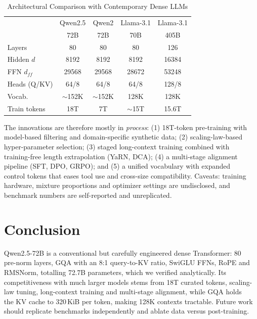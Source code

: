\documentclass[conference]{IEEEtran}
\begin{document}
\begin{table}[!tb]
\caption{Architectural Comparison with Contemporary Dense LLMs}
\label{tab:arch}
\centering\footnotesize
\setlength{\tabcolsep}{2.5pt}
\begin{tabular}{@{}lcccc@{}}
\toprule
 & Qwen2.5 & Qwen2 & Llama-3.1 & Llama-3.1 \\
 & 72B & 72B & 70B & 405B \\
\midrule
Layers & 80 & 80 & 80 & 126 \\
Hidden $d$ & 8192 & 8192 & 8192 & 16384 \\
FFN $d_{ff}$ & 29568 & 29568 & 28672 & 53248 \\
Heads (Q/KV) & 64/8 & 64/8 & 64/8 & 128/8 \\
Vocab. & $\sim$152K & $\sim$152K & 128K & 128K \\
Train tokens & 18T & 7T & $\sim$15T & 15.6T \\
\bottomrule
\end{tabular}
\end{table}

The innovations are therefore mostly in \textit{process}: (1) 18T-token pre-training with model-based filtering and domain-specific synthetic data; (2) scaling-law-based hyper-parameter selection; (3) staged long-context training combined with training-free length extrapolation (YaRN, DCA); (4) a multi-stage alignment pipeline (SFT, DPO, GRPO); and (5) a unified vocabulary with expanded control tokens that eases tool use and cross-size compatibility. Caveats: training hardware, mixture proportions and optimizer settings are undisclosed, and benchmark numbers are self-reported and unreplicated.

\section{Conclusion}
Qwen2.5-72B is a conventional but carefully engineered dense Transformer: 80 pre-norm layers, GQA with an 8:1 query-to-KV ratio, SwiGLU FFNs, RoPE and RMSNorm, totalling 72.7B parameters, which we verified analytically. Its competitiveness with much larger models stems from 18T curated tokens, scaling-law tuning, long-context training and multi-stage alignment, while GQA holds the KV cache to 320\,KiB per token, making 128K contexts tractable. Future work should replicate benchmarks independently and ablate data versus post-training.
\end{document}
